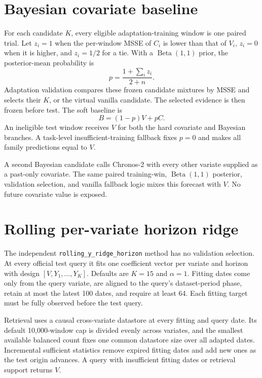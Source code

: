 \documentclass[10pt]{article}
\begin{document}
\section{Bayesian covariate baseline}

For each candidate $K$, every eligible adaptation-training window is one paired
trial. Let $z_i=1$ when the per-window MSSE of $C_i$ is lower than that of
$V_i$, $z_i=0$ when it is higher, and $z_i=1/2$ for a tie. With a
$\operatorname{Beta}(1,1)$ prior, the posterior-mean probability is
\begin{equation}
  p = \frac{1+\sum_i z_i}{2+n}.
\end{equation}
Adaptation validation compares these frozen candidate mixtures by MSSE and
selects their $K$, or the virtual vanilla candidate. The selected evidence is
then frozen before test. The soft baseline is
\begin{equation}
  B=(1-p)V+pC.
\end{equation}
An ineligible test window receives $V$ for both the hard covariate and Bayesian
branches. A task-level insufficient-training fallback fixes $p=0$ and makes
all family predictions equal to $V$.

A second Bayesian candidate calls Chronos-2 with every other variate supplied
as a past-only covariate. The same paired training-win,
$\operatorname{Beta}(1,1)$ posterior, validation selection, and vanilla
fallback logic mixes this forecast with $V$. No future covariate value is
exposed.

\section{Rolling per-variate horizon ridge}

The independent \texttt{rolling\_y\_ridge\_horizon} method has no validation
selection. At every official test query it fits one coefficient vector per
variate and horizon with design $[V,Y_1,\ldots,Y_K]$. Defaults are $K=15$ and
$\alpha=1$. Fitting dates come only from the query variate, are aligned to the
query's dataset-period phase, retain at most the latest 100 dates, and require
at least 64. Each fitting target must be fully observed before the test query.

Retrieval uses a causal cross-variate datastore at every fitting and query
date. Its default 10,000-window cap is divided evenly across variates, and the
smallest available balanced count fixes one common datastore size over all
adapted dates. Incremental sufficient statistics remove expired fitting dates
and add new ones as the test origin advances. A query with insufficient fitting
dates or retrieval support returns $V$.
\end{document}
